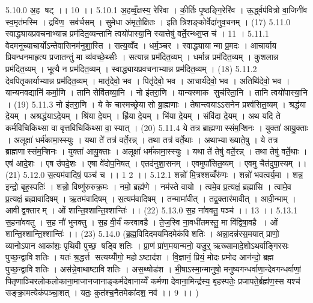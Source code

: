 5.10.0
अ॒ह षट् ।। 10 ।।
5.10.1
अ॒हव्वृँ॒क्षस्य॒ रेरि॑वा । की॒र्तिः पृ॒ष्ठङ्गि॒रेरि॑व । ऊ॒र्द्ध्वप॑वित्रो वा॒जिनी॑व स्व॒मृत॑मस्मि । द्रवि॑ण॒॒ सव॑र्चसम् । सुमेधा अ॑मृतो॒क्षितः । इति त्रिशङ्कोर्वेदा॑नुव॒चनम् । (17)
5.11.0
स्वाद्ध्यायप्रवचनाभ्यान्न प्रम॑दित॒व्यन्तानि त्वयो॑पास्या॒नि स्यात्तेषु॑ वर्ते॒रन्थ्स॒प्त च॑ । 11 ।
5.11.1
वेदमनूच्याचार्योऽन्तेवासिनम॑नुशा॒स्ति । सत्य॒व्वँद । धर्म॒ञ्चर । स्वाद्ध्यायान्मा प्र॒मदः । आचार्याय प्रियन्धनमाहृत्य प्रजातन्तुं मा व्य॑वच्छे॒थ्सीः । सत्यान्न प्रम॑दित॒व्यम् । धर्मान्न प्रम॑दित॒व्यम् । कुशलान्न प्रम॑दित॒व्यम् । भूत्यै न प्रम॑दित॒व्यम् । स्वाद्ध्यायप्रवचनाभ्यान्न प्रम॑दित॒व्यम् । (18)
5.11.2
देवपितृकार्याभ्यान्न प्रम॑दित॒व्यम् । मातृ॑देवो॒ भव । पितृ॑देवो॒ भव । आचार्य॑देवो॒ भव । अतिथि॑देवो॒ भव । यान्यनवद्यानि॑ कर्मा॒णि । तानि सेवि॑तव्या॒नि । नो इ॑तरा॒णि । यान्यस्माक सुच॑रिता॒नि । तानि त्वयो॑पास्या॒नि । (19)
5.11.3
नो इ॑तरा॒णि । ये के चास्मच्छ्रेया॑सो ब्रा॒ह्मणाः । तेषान्त्वयाऽऽसनेन प्रश्व॑सित॒व्यम् । श्रद्ध॑या दे॒यम् । अश्रद्ध॑याऽदे॒यम् । श्रि॑या दे॒यम् । ह्रि॑या दे॒यम् । भि॑या दे॒यम् । संवि॑दा दे॒यम् । अथ यदि ते कर्मविचिकिथ्सा वा वृत्तविचिकि॑थ्सा वा॒ स्यात् । (20)
5.11.4
ये तत्र ब्राह्मणास्संम॒ऱ्शिनः । युक्ता॑ आयु॒क्ताः । अलूक्षा॑ धर्म॑कामा॒स्स्युः । यथा ते॑ तत्र॑ वर्ते॒रन्न् । तथा तत्र॑ वर्ते॒थाः । अथाभ्याख्याते॒षु । ये तत्र ब्राह्मणास्संम॒ऱ्शिनः । युक्ता॑ आयु॒क्ताः । अलूक्षा॑ धर्म॑कामा॒स्स्युः । यथा ते॑ तेषु॑ वर्ते॒रन्न् । तथा तेषु॑ वर्ते॒थाः । एष॑ आदे॒शः । एष उ॑पदे॒शः । एषा वे॑दोप॒निषत् । एतद॑नुशा॒सनम् । एवमुपा॑सित॒व्यम् । एवमु चैत॑दुपा॒स्यम् ।। (21)
5.12.0
स॒त्यम॑वादिषं॒ पञ्च॑ च ।। 1 2 ।।
5.12.1
शन्नो॑ मि॒त्रश्शव्वँरु॑णः । शन्नो॑ भवत्वर्य॒मा । शन्न॒ इन्द्रो॒ बृह॒स्पतिः॑ । शन्नो॒ विष्णु॑रुरुक्र॒मः । नमो॒ ब्रह्म॑णे । नम॑स्ते वायो । त्वमे॒व प्र॒त्यक्षं॒ ब्रह्मा॑सि । त्वामे॒व प्र॒त्यक्षं॒ ब्रह्मावा॑दिषम् । ऋ॒तम॑वादिषम् । स॒त्यम॑वादिषम् । तन्मामा॑वीत् । तद्व॒क्तार॑मावीत् । आवी॒न्माम् । आवीद्व॒क्तारम् । ओं शान्ति॒श्शान्ति॒श्शान्तिः॑ ।। (22)
5.13.0
स॒ह ना॑ववतु॒ पञ्च॑ ।। 13 ।।
5.13.1
स॒हना॑ववतु । स॒ह नौ॑ भुनक्तु । स॒ह वी॒र्यं॑ करवावहै । ते॒ज॒स्वि ना॒वधी॑तमस्तु॒ मा वि॑द्विषा॒वहै । ओं शान्ति॒श्शान्ति॒श्शान्तिः॑ ।। (23)
5.14.0
(ब्र॒ह्म॒विदिदमयमिदमेक॑विशतिः । अन्ना॒दन्न॑रस॒मयात् प्राणो॒ व्यानोऽपान आका॑शः॒ पृथिवी पुच्छ॒॒ षड्वि॑शतिः । प्रा॒णं प्रा॑ण॒मयान्मनो॒ यजु॒र्॒ ऋख्सामादे॒शोऽथर्वाङ्गिरसः पुच्छ॒न्द्वावि॑शतिः । यतः॑ श्र॒द्धर्त्त सत्यय्योँ॑गो॒ महोऽष्टाद॑श । वि॒ज्ञानं॒ प्रियं॒ मोदः प्रमोद आन॑न्दो॒ ब्रह्म पुच्छ॒न्द्वावि॑शतिः । अस॑न्ने॒वाथाष्टावि॑शतिः । अस॒थ्षोड॑श । भी॒षाऽस्मा॒न्मानुषो॒ मनुष्यगन्धर्वाणा॒न्देवगन्धर्वाणां॒ पितृणाञ्चिरलोकलोकाना॒माजानजानाङ्कर्मदेवानाय्येँ कर्मणा देवाना॒मिन्द्र॑स्य॒ बृहस्पतेः॒ प्रजापते॒र्ब्रह्म॑ण॒स्स यश्च॑ सङ्क्रा॒मत्येक॑पञ्चा॒शत् । यतः॒ कुत॑श्च॒नैतमेका॑दश॒ नव॑ ।। 9 ।। )
